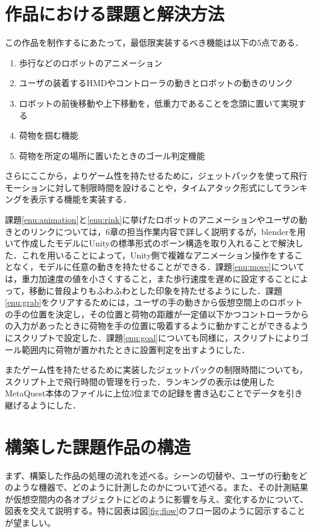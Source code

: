 \documentclass[12pt, xelatex,ja=standard,jafont=hiragino]{bxjsarticle}
\newif\ifdraft
\begin{document}
\section{作品における課題と解決方法}
\ifdraft
作品における課題について計画、達成するべき課題などをまとめ、その課題を解決するためにどのような技術や機器を用いたのかを説明する。
\fi
この作品を制作するにあたって，最低限実装するべき機能は以下の5点である．
\begin{enumerate}
    \item 歩行などのロボットのアニメーション \label{enu:animation}
    \item ユーザの装着するHMDやコントローラの動きとロボットの動きのリンク \label{enu:rink}
    \item ロボットの前後移動や上下移動を，低重力であることを念頭に置いて実現する \label{enu:move}
    \item 荷物を掴む機能 \label{enu:grab}
    \item 荷物を所定の場所に置いたときのゴール判定機能 \label{enu:goal}
\end{enumerate}
さらにここから，よりゲーム性を持たせるために，ジェットパックを使って飛行モーションに対して制限時間を設けることや，タイムアタック形式にしてランキングを表示する機能を実装する．

課題\ref{enu:animation}と\ref{enu:rink}に挙げたロボットのアニメーションやユーザの動きとのリンクについては，6章の担当作業内容で詳しく説明するが，blenderを用いて作成したモデルにUnityの標準形式のボーン構造を取り入れることで解決した．これを用いることによって，Unity側で複雑なアニメーション操作をすることなく，モデルに任意の動きを持たせることができる．課題\ref{enu:move}については，重力加速度の値を小さくすること，また歩行速度を遅めに設定することによって，移動に普段よりもふわふわとした印象を持たせるようにした．課題\ref{enu:grab}をクリアするためには，ユーザの手の動きから仮想空間上のロボットの手の位置を決定し，その位置と荷物の距離が一定値以下かつコントローラからの入力があったときに荷物を手の位置に吸着するように動かすことができるようにスクリプトで設定した．課題\ref{enu:goal}についても同様に，スクリプトによりゴール範囲内に荷物が置かれたときに設置判定を出すようにした．

またゲーム性を持たせるために実装したジェットパックの制限時間についても，スクリプト上で飛行時間の管理を行った．ランキングの表示は使用したMetaQuest本体のファイルに上位3位までの記録を書き込むことでデータを引き継げるようにした．


\section{構築した課題作品の構造}
\ifdraft
まず、構築した作品の処理の流れを述べる。シーンの切替や、ユーザの行動をどのような機器で、どのように計測したのかについて述べる。また、その計測結果が仮想空間内の各オブジェクトにどのように影響を与え、変化するかについて、図表を交えて説明する。特に図表は\mbox{図\ref{fig:flow}}のフロー図のように図示することが望ましい。
\end{document}
